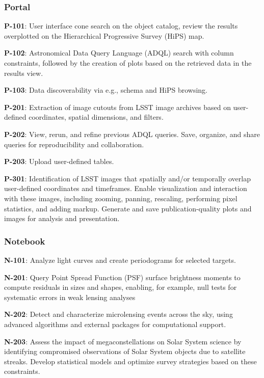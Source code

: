 
\subsubsection{Portal}

\textbf{P-101}: User interface cone search on the object catalog, review the results overplotted on the Hierarchical Progressive Survey (HiPS) map.

\textbf{P-102}: Astronomical Data Query Language (ADQL) search with column constraints, followed by the creation of plots based on the retrieved data in the results view.

\textbf{P-103}: Data discoverability via e.g., schema and HiPS browsing. 

\textbf{P-201}: Extraction of image cutouts from LSST image archives based on user-defined coordinates, spatial dimensions, and filters.

\textbf{P-202}:  View, rerun, and refine previous ADQL queries. Save, organize, and share queries for reproducibility and collaboration.

\textbf{P-203}: Upload user-defined tables.

\textbf{P-301}: Identification of LSST images that spatially and/or temporally overlap user-defined coordinates and timeframes. Enable visualization and interaction with these images, including zooming, panning, rescaling, performing pixel statistics, and adding markup. Generate and save publication-quality plots and images for analysis and presentation.

\subsubsection{Notebook}

\textbf{N-101}: Analyze light curves and create periodograms for selected targets. 

\textbf{N-201}: Query Point Spread Function (PSF) surface brightness moments to compute residuals in sizes and shapes, enabling, for example, null tests for systematic errors in weak lensing analyses 

\textbf{N-202}: Detect and characterize microlensing events across the sky, using advanced algorithms and external packages for computational support.

\textbf{N-203}: Assess the impact of megaconstellations on Solar System science by identifying compromised observations of Solar System objects due to satellite streaks.
Develop statistical models and optimize survey strategies based on these constraints.

